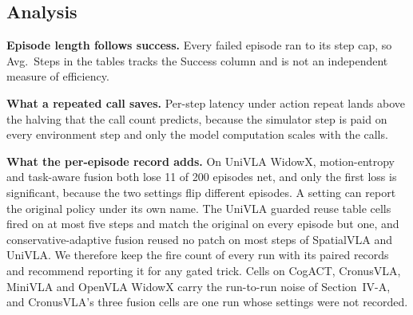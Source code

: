 \subsection{Analysis}

\textbf{Episode length follows success.} Every failed episode ran to its
step cap, so Avg.\ Steps in the tables tracks the Success column and is
not an independent measure of efficiency.

\textbf{What a repeated call saves.} Per-step latency under action repeat
lands above the halving that the call count predicts, because the
simulator step is paid on every environment step and only the model
computation scales with the calls.

\textbf{What the per-episode record adds.} On UniVLA WidowX,
motion-entropy and task-aware fusion both lose 11 of 200 episodes net,
and only the first loss is significant, because the two settings flip
different episodes. A setting can report the original policy under its
own name. The UniVLA guarded reuse table cells fired on at most five
steps and match the original on every episode but one, and
conservative-adaptive fusion reused no patch on most steps of SpatialVLA
and UniVLA. We therefore keep the fire count of every run with its paired records
and recommend reporting it for any gated trick. Cells on CogACT, CronusVLA, MiniVLA and
OpenVLA WidowX carry the run-to-run noise of Section~IV-A, and
CronusVLA's three fusion cells are one run whose settings were not
recorded.
